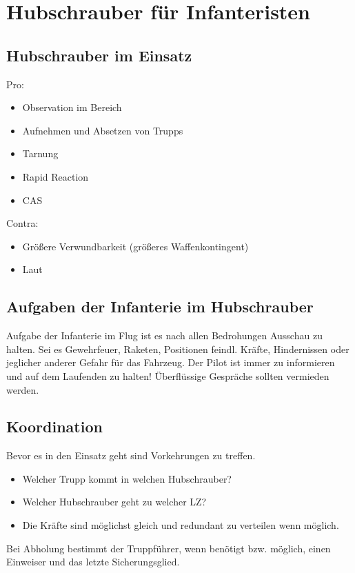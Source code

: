 \pagebreak
\section{Hubschrauber für Infanteristen}
\label{HuFIn}

\subsection{Hubschrauber im Einsatz}
	Pro: 
		\begin{itemize}
			\item Observation im Bereich
			\item Aufnehmen und Absetzen von Trupps
			\item Tarnung
			\item Rapid Reaction
			\item \ac{CAS}
		\end{itemize}

	Contra: 
		\begin{itemize} 
			\item Größere Verwundbarkeit (größeres Waffenkontingent)
			\item Laut
		\end{itemize}

\subsection{Aufgaben der Infanterie im Hubschrauber}
	Aufgabe der Infanterie im Flug ist es nach allen Bedrohungen Ausschau zu halten. Sei es Gewehrfeuer, Raketen, Positionen feindl. Kräfte, Hindernissen oder jeglicher anderer Gefahr für das Fahrzeug. Der Pilot ist immer zu informieren und auf dem Laufenden zu halten! Überflüssige Gespräche sollten vermieden werden.

\subsection{Koordination}
	Bevor es in den Einsatz geht sind Vorkehrungen zu treffen. 
		\begin{itemize} 
			\item Welcher Trupp kommt in welchen Hubschrauber? 
			\item Welcher Hubschrauber geht zu welcher \ac{LZ}? 	
			\item Die Kräfte sind möglichst gleich und redundant zu verteilen wenn möglich.
		\end{itemize}

	Bei Abholung bestimmt der Truppführer, wenn benötigt bzw. möglich, einen Einweiser und das letzte Sicherungsglied.

